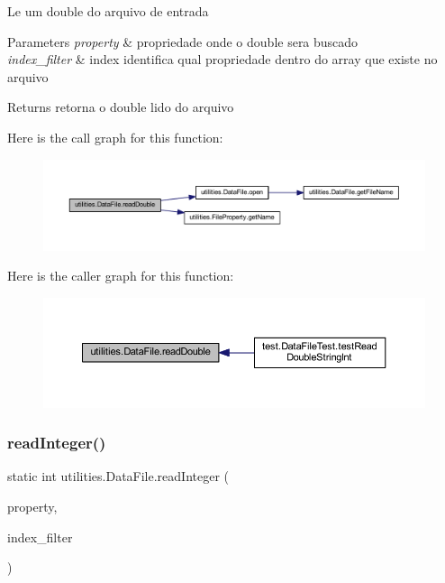 Le um double do arquivo de entrada 
\begin{DoxyParams}{Parameters}
{\em property} & propriedade onde o double sera buscado \\
\hline
{\em index\+\_\+filter} & index identifica qual propriedade dentro do array que existe no arquivo \\
\hline
\end{DoxyParams}
\begin{DoxyReturn}{Returns}
retorna o double lido do arquivo 
\end{DoxyReturn}
Here is the call graph for this function\+:\nopagebreak
\begin{figure}[H]
\begin{center}
\leavevmode
\includegraphics[width=350pt]{classutilities_1_1_data_file_aafa9fbee5003c8d9abcd0b02ba4b31dc_cgraph}
\end{center}
\end{figure}
Here is the caller graph for this function\+:\nopagebreak
\begin{figure}[H]
\begin{center}
\leavevmode
\includegraphics[width=350pt]{classutilities_1_1_data_file_aafa9fbee5003c8d9abcd0b02ba4b31dc_icgraph}
\end{center}
\end{figure}
\mbox{\label{classutilities_1_1_data_file_a7576f90d40db372f262216f8f6a64c28}} 
\subsubsection{\texorpdfstring{read\+Integer()}{readInteger()}}
{\footnotesize\ttfamily static int utilities.\+Data\+File.\+read\+Integer (\begin{DoxyParamCaption}\item[{\hyperlink{enumutilities_1_1_file_property}{File\+Property}}]{property,  }\item[{int}]{index\+\_\+filter }\end{DoxyParamCaption})\hspace{0.3cm}{\ttfamily [static]}}

